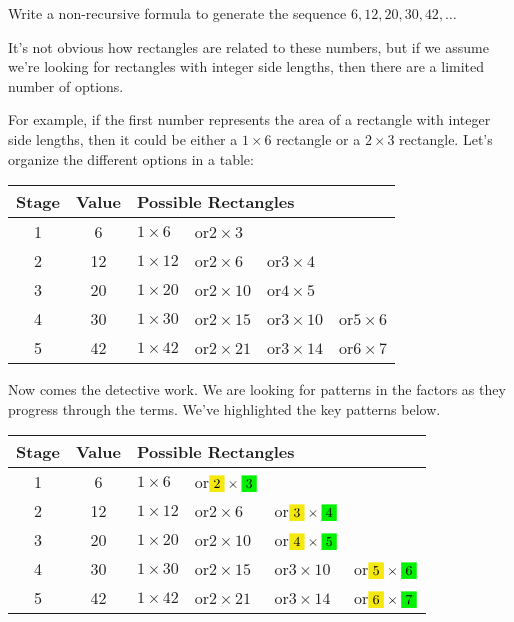 \begin{boxedex}
Write a non-recursive formula to generate the sequence $6, 12, 20, 30, 42,\dotsc$

\exsoln{} It's not obvious how rectangles are related to these numbers, but if we assume we're looking for rectangles with integer side lengths, then there are a limited number of options.

For example, if the first number represents the area of a rectangle with integer side lengths, then it could be either a $1\times6$ rectangle or a $2\times3$ rectangle. Let's organize the different options in a table:

\begin{center}
\begin{tabular}{c|c|llll}
Stage		& Value		& \multicolumn{4}{l}{Possible Rectangles}
\\\hline
1			& 6			& $1 \times 6$
						& or\quad $2 \times 3$
						& ~
\\
2			& 12		& $1 \times 12$
						& or\quad $2 \times 6$
						& or\quad $3 \times 4$
\\
3			& 20		& $1 \times 20$
						& or\quad $2 \times 10$
						& or\quad $4 \times 5$
\\
4			& 30		& $1 \times 30$
						& or\quad $2 \times 15$
						& or\quad $3 \times 10$
						& or\quad $5 \times 6$
\\
5			& 42		& $1 \times 42$
						& or\quad $2 \times 21$
						& or\quad $3 \times 14$
						& or\quad $6 \times 7$
\\
\end{tabular}
\end{center}

Now comes the detective work. We are looking for patterns in the factors as they progress through the terms. We've highlighted the key patterns below.

\begin{center}
\begin{tabular}{c|c|llll}
Stage		& Value		& \multicolumn{4}{l}{Possible Rectangles}
\\\hline
1			& 6			& $1 \times 6$
						& or\quad $\colorbox{yellow!95!black}{2} \times \colorbox{green!95!black}{3}$
						& ~
\\
2			& 12		& $1 \times 12$
						& or\quad $2 \times 6$
						& or\quad $\colorbox{yellow!95!black}{3} \times \colorbox{green!95!black}{4}$
\\
3			& 20		& $1 \times 20$
						& or\quad $2 \times 10$
						& or\quad $\colorbox{yellow!95!black}{4} \times \colorbox{green!95!black}{5}$
\\
4			& 30		& $1 \times 30$
						& or\quad $2 \times 15$
						& or\quad $3 \times 10$
						& or\quad $\colorbox{yellow!95!black}{5} \times \colorbox{green!95!black}{6}$
\\
5			& 42		& $1 \times 42$
						& or\quad $2 \times 21$
						& or\quad $3 \times 14$
						& or\quad $\colorbox{yellow!95!black}{6} \times \colorbox{green!95!black}{7}$
\\
\end{tabular}
\end{center}


\end{boxedex}

